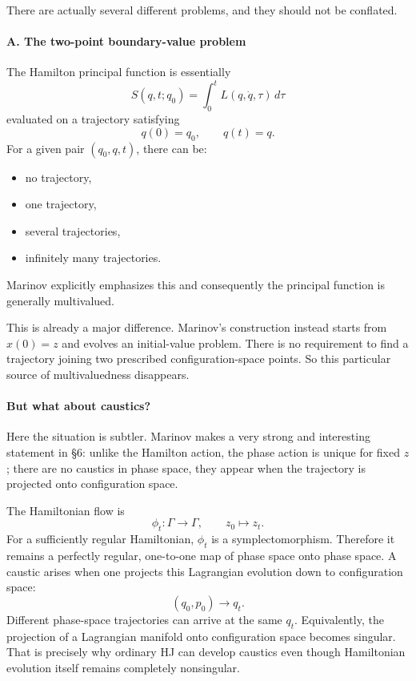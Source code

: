 There are actually several different problems, and they should not be conflated.

\paragraph{A. The two-point boundary-value problem}
The Hamilton principal function is essentially
$$ S(q,t;q_0) = \int_0^t L(q,\dot q,\tau)\,d\tau $$
evaluated on a trajectory satisfying
$$ q(0)=q_0,\qquad q(t)=q. $$
For a given pair \((q_0,q,t)\), there can be:
\begin{itemize}
   \item no trajectory,
   \item one trajectory,
   \item several trajectories,
   \item infinitely many trajectories.
\end{itemize}
Marinov explicitly emphasizes this and consequently the principal function is
generally multivalued.

This is already a major difference.
Marinov's construction instead starts from $ x(0)=z $
and evolves an initial-value problem. There is no requirement to find a
trajectory joining two prescribed configuration-space points.
So this particular source of multivaluedness disappears.

\paragraph{But what about caustics?}
Here the situation is subtler.
Marinov makes a very strong and interesting statement in §6:
unlike the Hamilton action, the phase action is unique for fixed \(z\); there
are no caustics in phase space, they appear when the trajectory is projected
onto configuration space.

The Hamiltonian flow is
$$ \phi_t:\Gamma\rightarrow\Gamma, \qquad z_0\mapsto z_t. $$
For a sufficiently regular Hamiltonian, \(\phi_t\) is a symplectomorphism.
Therefore it remains a perfectly regular, one-to-one map of phase space onto
phase space.
A caustic arises when one projects this Lagrangian evolution down to
configuration space:
$$ (q_0,p_0)\longrightarrow q_t. $$
Different phase-space trajectories can arrive at the same \(q_t\).
Equivalently, the projection of a Lagrangian manifold onto configuration space
becomes singular.
That is precisely why ordinary HJ can develop caustics even though Hamiltonian
evolution itself remains completely nonsingular.

